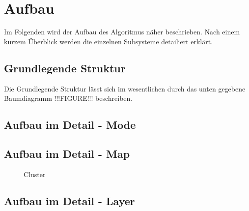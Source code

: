 \section{Aufbau}
    Im Folgenden wird der Aufbau des Algoritmus näher beschrieben. 
    Nach einem kurzem Überblick werden die einzelnen Subsysteme detailiert erklärt.
    \subsection{Grundlegende Struktur}
    Die Grundlegende Struktur lässt sich im wesentlichen durch das unten gegebene Baumdiagramm !!!FIGURE!!! beschreiben.
    
    \subsection{Aufbau im Detail - Mode}
        

    \subsection{Aufbau im Detail - Map}
    \begin{figure}
    \caption{Cluster}
    \end{figure}

    \subsection{Aufbau im Detail - Layer}
    